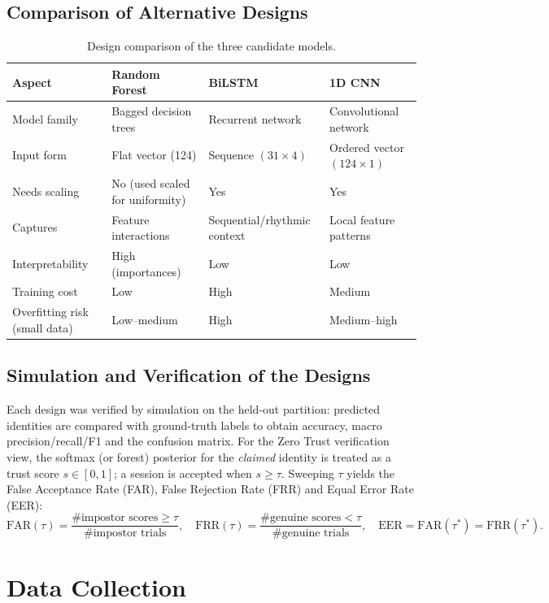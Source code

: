 \subsection{Comparison of Alternative Designs}
\begin{table}[H]
\centering
\caption{Design comparison of the three candidate models.}
\begin{tabular}{@{}p{3.1cm}p{3.6cm}p{3.6cm}p{3.6cm}@{}}
\toprule
\textbf{Aspect} & \textbf{Random Forest} & \textbf{BiLSTM} & \textbf{1D CNN} \\ \midrule
Model family & Bagged decision trees & Recurrent network & Convolutional network \\
Input form & Flat vector (124) & Sequence $(31\times4)$ & Ordered vector $(124\times1)$ \\
Needs scaling & No (used scaled for uniformity) & Yes & Yes \\
Captures & Feature interactions & Sequential/rhythmic context & Local feature patterns \\
Interpretability & High (importances) & Low & Low \\
Training cost & Low & High & Medium \\
Overfitting risk (small data) & Low--medium & High & Medium--high \\ \bottomrule
\end{tabular}
\end{table}

\subsection{Simulation and Verification of the Designs}
Each design was verified by simulation on the held-out partition: predicted identities are compared with ground-truth labels to obtain accuracy, macro precision/recall/F1 and the confusion matrix. For the Zero Trust verification view, the softmax (or forest) posterior for the \emph{claimed} identity is treated as a trust score $s\in[0,1]$; a session is accepted when $s\ge\tau$. Sweeping $\tau$ yields the False Acceptance Rate (FAR), False Rejection Rate (FRR) and Equal Error Rate (EER):
\begin{equation}
\mathrm{FAR}(\tau)=\frac{\#\text{impostor scores}\ge\tau}{\#\text{impostor trials}},\quad
\mathrm{FRR}(\tau)=\frac{\#\text{genuine scores}<\tau}{\#\text{genuine trials}},\quad
\mathrm{EER}=\mathrm{FAR}(\tau^\ast)=\mathrm{FRR}(\tau^\ast).
\end{equation}

\section{Data Collection}
\label{sec:data_collection}

